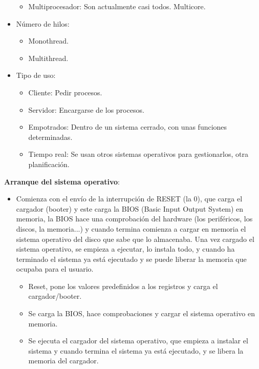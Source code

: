 \documentclass[12pt, twoside, openright]{report} %
\begin{document}
\begin{itemize}
\begin{itemize}
    \item Multiprocesador: Son actualmente casi todos. Multicore.
      
    \end{itemize}
  \item Número de hilos:
    

    \begin{itemize}
    \item Monothread.
      
    \item Multithread.
      
    \end{itemize}
  \item Tipo de uso:
    

    \begin{itemize}
    \item Cliente: Pedir procesos.
      
    \item Servidor: Encargarse de los procesos.
      
    \item Empotrados: Dentro de un sistema cerrado, con unas funciones
      determinadas.
      
    \item Tiempo real: Se usan otros sistemas operativos para gestionarlos,
      otra planificación.
      
    \end{itemize}
  \end{itemize}
  
  \textbf{Arranque del sistema operativo}:
  

  \begin{itemize}
  \item Comienza con el envío de la interrupción de RESET (la 0), que carga
    el cargador (booter) y este carga la BIOS (Basic Input Output
    System) en memoria, la BIOS hace una comprobación del hardware (los
    periféricos, los discos, la memoria...) y cuando termina comienza a
    cargar en memoria el sistema operativo del disco que sabe que lo
    almacenaba. Una vez cargado el sistema operativo, se empieza a
    ejecutar, lo instala todo, y cuando ha terminado el sistema ya está
    ejecutado y se puede liberar la memoria que ocupaba para el usuario.
    

    \begin{itemize}
    \item Reset, pone los valores predefinidos a los registros y carga el
      cargador/booter.
      
    \item Se carga la BIOS, hace comprobaciones y cargar el sistema
      operativo en memoria.
      
    \item Se ejecuta el cargador del sistema operativo, que empieza a
      instalar el sistema y cuando termina el sistema ya está ejecutado,
      y se libera la memoria del cargador.
      
    \end{itemize}
  \end{itemize}
  
\end{document}
